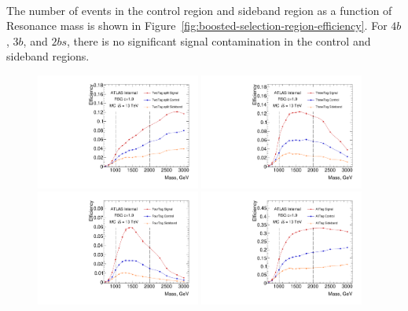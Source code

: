 \paragraph{}
The number of events in the control region and sideband region as a function of Resonance mass is shown in Figure~\ref{fig:boosted-selection-region-efficiency}. 
For $4b$, $3b$, and $2bs$, there is no significant signal contamination in the control and sideband regions.

\begin{figure}
\begin{center}
\includegraphics[width=0.48\textwidth,angle=-90]{figures/boosted/SigEff/region_2b_lst_Moriond_Efficiency_PreSel.pdf}
\includegraphics[width=0.48\textwidth,angle=-90]{figures/boosted/SigEff/region_3b_lst_Moriond_Efficiency_PreSel.pdf} \\
\includegraphics[width=0.48\textwidth,angle=-90]{figures/boosted/SigEff/region_4b_lst_Moriond_Efficiency_PreSel.pdf}
\includegraphics[width=0.48\textwidth,angle=-90]{figures/boosted/SigEff/region_alltag_lst_Moriond_Efficiency_PreSel.pdf} \\

\end{center}
\end{figure}
